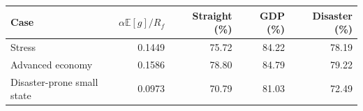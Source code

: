 \begin{tabular}{@{}lrrrr@{}}
\toprule
Case & $\alpha\mathbb E[g]/R_f$ & Straight (\%) & GDP (\%) & Disaster (\%) \\ \midrule
Stress & 0.1449 & 75.72 & 84.22 & 78.19 \\
Advanced economy & 0.1586 & 78.80 & 84.79 & 79.22 \\
Disaster-prone small state & 0.0973 & 70.79 & 81.03 & 72.49 \\
\bottomrule
\end{tabular}
